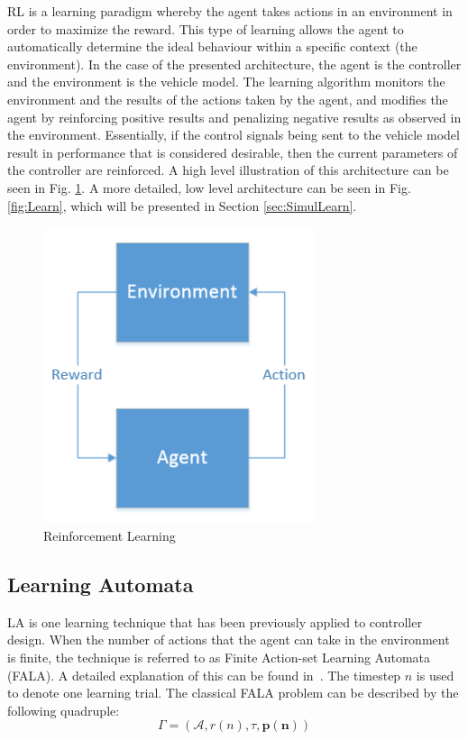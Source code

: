 \documentclass[conference]{IEEEtran}
\begin{document}
RL is a learning paradigm whereby the agent takes actions in an environment in order to maximize the reward. This type of learning allows the agent to automatically determine the ideal behaviour within a specific context (the environment). In the case of the presented architecture, the agent is the controller and the environment is the vehicle model. The learning algorithm monitors the environment and the  results of the actions taken by the agent, and modifies the agent by reinforcing positive results and penalizing negative results as observed in the environment. Essentially, if the control signals being sent to the vehicle model result in performance that is considered desirable, then the current parameters of the controller are reinforced. A high level illustration of this architecture can be seen in Fig. \ref{fig:RL}. A more detailed, low level architecture can be seen in Fig. \ref{fig:Learn}, which will be presented in Section \ref{sec:SimulLearn}.

\begin{figure}[tb]
\centering
\includegraphics[width=80mm]{RL.PNG}
\caption{Reinforcement Learning}
\label{fig:RL}
\end{figure} 

\subsection{Learning Automata}

LA is one learning technique that has been previously applied to controller design. When the number of actions that the agent can take in the environment is finite, the technique is referred to as Finite Action-set Learning Automata (FALA). A detailed explanation of this can be found in~\cite{Barros-2015}. The timestep $n$ is used to denote one learning trial. The classical FALA problem can be described by the following quadruple: $$ \Gamma=(\mathcal{A}, r(n), \tau, \mathbf{p(n)})$$  
\end{document}
